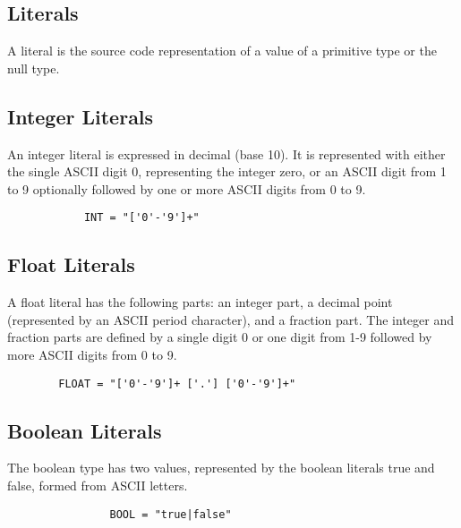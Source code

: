 \begin{homeworkProblem}
	
	\section{Literals}
	A literal is the source code representation of a value of a primitive type or the null type.
	
	\subsection{Integer Literals}
	An integer literal is expressed in decimal (base 10). It is represented with either the single ASCII digit 0, representing the integer zero, or an ASCII digit from 1 to 9 optionally followed by one or more ASCII digits from 0 to 9. 
	
	\begin{verbatim}
			INT = "['0'-'9']+"
	\end{verbatim}
	
	\subsection{Float Literals}
	A float literal has the following parts: an integer part, a decimal point (represented by an ASCII period character), and a fraction part. The integer and fraction parts are defined by a single digit 0 or one digit from 1-9 followed by more ASCII digits from 0 to 9.
	\begin{verbatim}
		FLOAT = "['0'-'9']+ ['.'] ['0'-'9']+"
	\end{verbatim}
	
	\subsection{Boolean Literals}
	The boolean type has two values, represented by the boolean literals true and false, formed from ASCII letters.
	\begin{verbatim}
				BOOL = "true|false"
	\end{verbatim}
	

\end{homeworkProblem}
